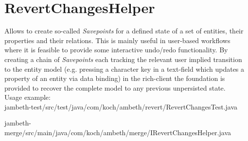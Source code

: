 \section{RevertChangesHelper}
\label{feature:RevertChangesHelper}
\ClearAPI
Allows to create so-called \textit{Savepoints} for a defined state of a set of entities, their properties and their relations. This is mainly useful in user-based workflows where it is feasible to provide some interactive undo/redo functionality. By creating a chain of \textit{Savepoints} each tracking the relevant user implied transition to the entity model (e.g. pressing a character key in a text-field which updates a property of an entity via data binding) in the rich-client the foundation is provided to recover the complete model to any previous unpersisted state.\\ Usage example:\\

{jambeth-test/src/test/java/com/koch/ambeth/revert/RevertChangesTest.java}

{jambeth-merge/src/main/java/com/koch/ambeth/merge/IRevertChangesHelper.java}


